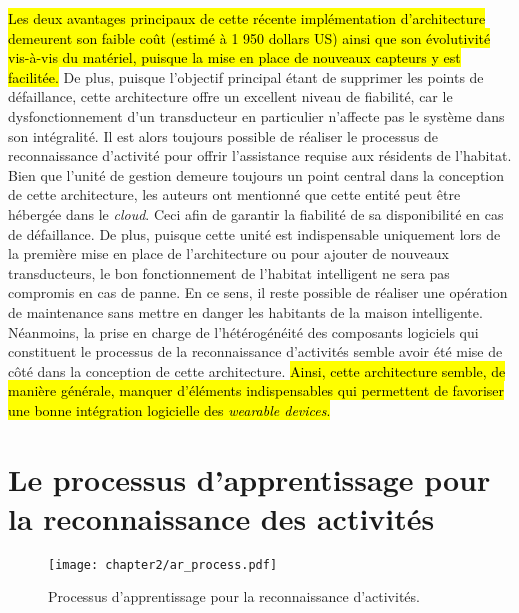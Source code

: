 \hl{Les deux avantages principaux de cette récente implémentation d'architecture demeurent son faible coût (estimé à 1 950 dollars US) ainsi que son évolutivité vis-à-vis du matériel, puisque la mise en place de nouveaux capteurs y est facilitée.} De plus, puisque l'objectif principal étant de supprimer les points de défaillance, cette architecture offre un excellent niveau de fiabilité, car le dysfonctionnement d'un transducteur en particulier n'affecte pas le système dans son intégralité. Il est alors toujours possible de réaliser le processus de reconnaissance d'activité pour offrir l'assistance requise aux résidents de l'habitat. Bien que l'unité de gestion demeure toujours un point central dans la conception de cette architecture, les auteurs ont mentionné que cette entité peut être hébergée dans le \textit{cloud}. Ceci afin de garantir la fiabilité de sa disponibilité en cas de défaillance. De plus, puisque cette unité est indispensable uniquement lors de la première mise en place de l'architecture ou pour ajouter de nouveaux transducteurs, le bon fonctionnement de l'habitat intelligent ne sera pas compromis en cas de panne. En ce sens, il reste possible de réaliser une opération de maintenance sans mettre en danger les habitants de la maison intelligente. Néanmoins, la prise en charge de l'hétérogénéité des composants logiciels qui constituent le processus de la reconnaissance d'activités semble avoir été mise de côté dans la conception de cette architecture. \hl{Ainsi, cette architecture semble, de manière générale, manquer d'éléments indispensables qui permettent de favoriser une bonne intégration logicielle des \textit{wearable devices}.}

\section{Le processus d'apprentissage pour la reconnaissance des activités}

\begin{figure}[b!]
	\centering
	\texttt{[image: chapter2/ar\_process.pdf]}
	\caption{Processus d'apprentissage pour la reconnaissance d'activités.}
	\label{fig:ar_process}
\end{figure}

